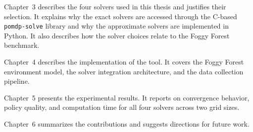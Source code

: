 Chapter~3 describes the four solvers used in this thesis and justifies their selection.
It explains why the exact solvers are accessed through the C-based \texttt{pomdp-solve} library and why the approximate solvers are implemented in Python.
It also describes how the solver choices relate to the Foggy Forest benchmark.

Chapter~4 describes the implementation of the tool.
It covers the Foggy Forest environment model, the solver integration architecture, and the data collection pipeline.

Chapter~5 presents the experimental results.
It reports on convergence behavior, policy quality, and computation time for all four solvers across two grid sizes.

Chapter~6 summarizes the contributions and suggests directions for future work.
